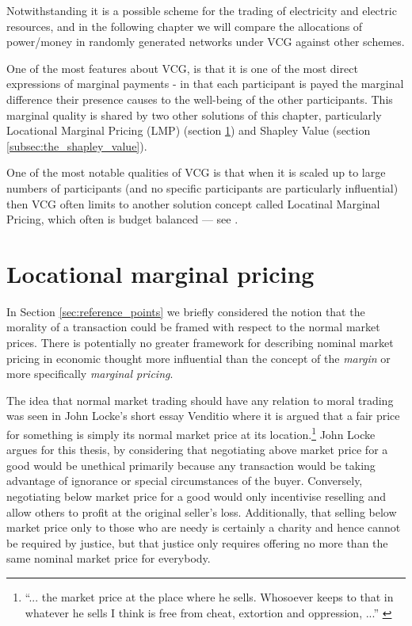 Notwithstanding it is a possible scheme for the trading of electricity and electric resources, and in the following chapter we will compare the allocations of power/money in randomly generated networks under VCG against other schemes.

One of the most features about VCG, is that it is one of the most direct expressions of marginal payments - in that each participant is payed the marginal difference their presence causes to the well-being of the other participants.
This marginal quality is shared by two other solutions of this chapter, particularly Locational Marginal Pricing (LMP) (section \ref{sec:solutions_LMP}) and Shapley Value (section \ref{subsec:the_shapley_value}).

One of the most notable qualities of VCG is that when it is scaled up to large numbers of participants (and no specific participants are particularly influential) then VCG often limits to another solution concept called Locatinal Marginal Pricing, which often is budget balanced --- see \cite{NATH2019673, 8430852}.


\section{Locational marginal pricing}\label{sec:solutions_LMP}

In Section \ref{sec:reference_points} we briefly considered the notion that %
the morality of a transaction could be framed with respect to the normal market prices.
There is potentially no greater framework for describing nominal market pricing in economic thought more influential than the concept of the \textit{margin} or more specifically \textit{marginal pricing}.

The idea that normal market trading should have any relation to moral trading was seen in John Locke's short essay Venditio where it is argued that a fair price for something is simply its normal market price at its location.\footnote{``... the market price at the place where he sells. Whosoever keeps to that in whatever he sells I think is free from cheat, extortion and oppression, ...'' \citep{locke2003locke}}
John Locke argues for this thesis, by considering that negotiating above market price for a good would be unethical primarily because any transaction would be taking advantage of ignorance or special circumstances of the buyer.
Conversely, negotiating below market price for a good would only incentivise reselling and allow others to profit at the original seller's loss.
Additionally, that selling below market price only to those who are needy is certainly a charity and hence cannot be required by justice, but that justice only requires offering no more than the same nominal market price for everybody.

